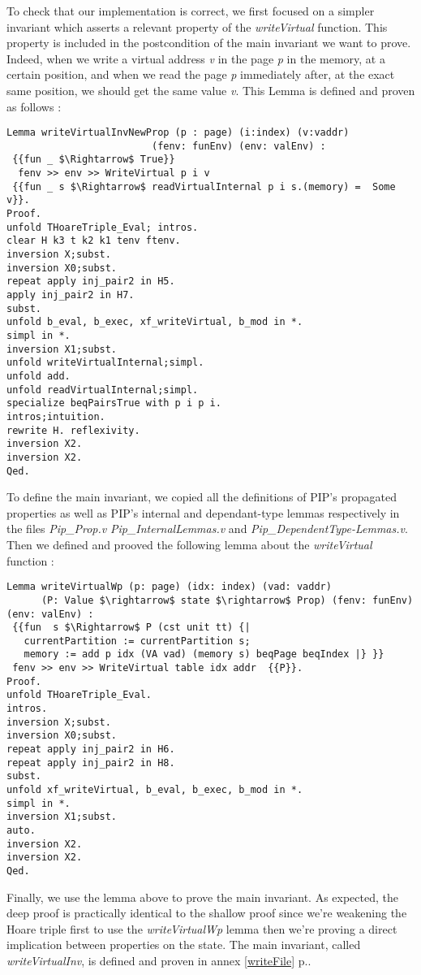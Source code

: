To check that our implementation is correct, we first focused on a simpler invariant which asserts a relevant property of the \textit{writeVirtual} function. This property is included in the postcondition of the main invariant we want to prove. Indeed, when we write a virtual address \textit{v} in the page \textit{p} in the memory, at a certain position, and when we read the page \textit{p} immediately after, at the exact same position, we should get the same value \textit{v}. This Lemma is defined and proven as follows :
\begin{lstlisting}[caption = {writeVirtualInvNewProp invariant definition}, xleftmargin=-.05\textwidth,
xrightmargin=-.05\textwidth,mathescape=true, label={writeNew}]
Lemma writeVirtualInvNewProp (p : page) (i:index) (v:vaddr) 
	                     (fenv: funEnv) (env: valEnv) :
 {{fun _ $\Rightarrow$ True}}
  fenv >> env >> WriteVirtual p i v
 {{fun _ s $\Rightarrow$ readVirtualInternal p i s.(memory) =  Some v}}.
Proof.
unfold THoareTriple_Eval; intros.
clear H k3 t k2 k1 tenv ftenv.
inversion X;subst.
inversion X0;subst.
repeat apply inj_pair2 in H5.
apply inj_pair2 in H7.
subst.
unfold b_eval, b_exec, xf_writeVirtual, b_mod in *.
simpl in *.
inversion X1;subst.
unfold writeVirtualInternal;simpl.
unfold add.
unfold readVirtualInternal;simpl.
specialize beqPairsTrue with p i p i.
intros;intuition.
rewrite H. reflexivity.
inversion X2.
inversion X2.
Qed.    
\end{lstlisting} \vspace{4pt}

To define the main invariant, we copied all the definitions of PIP's propagated properties as well as PIP's internal and dependant-type lemmas respectively in the files \textit{Pip\_Prop.v} \textit{Pip\_InternalLemmas.v} and \textit{Pip\_DependentType-\linebreak Lemmas.v}. Then we defined and prooved the following lemma about the  \textit{writeVirtual} function :
\begin{lstlisting}[caption = {writeVirtualWp lemma definition and proof}, xleftmargin=-.09\textwidth,
xrightmargin=-.09\textwidth,mathescape=true]
Lemma writeVirtualWp (p: page) (idx: index) (vad: vaddr) 
      (P: Value $\rightarrow$ state $\rightarrow$ Prop) (fenv: funEnv) (env: valEnv) :
 {{fun  s $\Rightarrow$ P (cst unit tt) {| 
   currentPartition := currentPartition s;
   memory := add p idx (VA vad) (memory s) beqPage beqIndex |} }} 
 fenv >> env >> WriteVirtual table idx addr  {{P}}.
Proof.
unfold THoareTriple_Eval.
intros. 
inversion X;subst.
inversion X0;subst.
repeat apply inj_pair2 in H6.
repeat apply inj_pair2 in H8.
subst.
unfold xf_writeVirtual, b_eval, b_exec, b_mod in *.
simpl in *.
inversion X1;subst.
auto.
inversion X2.
inversion X2.
Qed.
\end{lstlisting} \vspace{4pt}
Finally, we use the lemma above to prove the main invariant. As expected, the deep proof is practically identical to the shallow proof since we're weakening the Hoare triple first to use the 
\textit{writeVirtualWp} lemma then we're proving a direct implication between properties on the state. The main invariant, called \textit{writeVirtualInv}, is defined and proven in annex \ref{writeFile} p.\pageref{writeFile}. 

